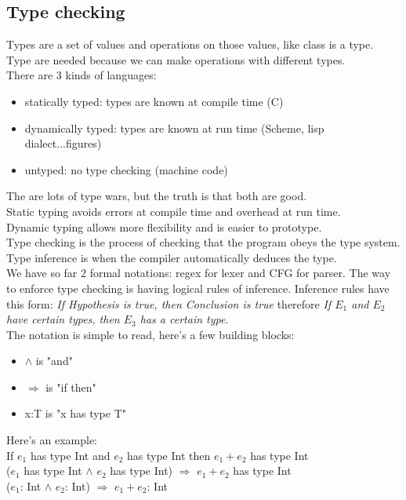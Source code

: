 \documentclass[12pt]{article}
\begin{document}
\subsection{Type checking}
Types are a set of values and operations on those values, like class is a type.
Type are needed because we can make operations with different types.
\\ There are 3 kinds of languages: 
\begin{itemize}
    \item statically typed: types are known at compile time (C)
    \item dynamically typed: types are known at run time (Scheme, lisp dialect...figures)
    \item untyped: no type checking (machine code)
\end{itemize}
The are lots of type wars, but the truth is that both are good. 
\\ Static typing avoids errors at compile time and overhead at run time. 
\\ Dynamic typing allows more flexibility and is easier to prototype.
\\ Type checking is the process of checking that the program obeys the type system. Type inference is when the compiler automatically deduces the type.
\\ We have so far 2 formal notations: regex for lexer and CFG for parser. The way to enforce type checking is having logical rules of inference. Inference rules have this form: \emph{If Hypothesis is true, then Conclusion is true} therefore \emph{If $E_1$ and $E_2$ have certain types, then $E_3$ has a certain type}.
\\ The notation is simple to read, here's a few building blocks: 
\begin{itemize}
    \item $\wedge$ is "and" 
    \item $\Rightarrow$ is "if then"
    \item x:T is "x has type T"
\end{itemize}
Here's an example: 
\\ If $e_1$ has type Int and $e_2$ has type Int then $e_1 + e_2$ has type Int
\vspace{2mm} 
\\($e_1$ has type Int $\wedge$ $e_2$ has type Int) $\Rightarrow$ $e_1 + e_2$ has type Int
\vspace{2mm} 
\\($e_1$: Int $\wedge$ $e_2$: Int) $\Rightarrow$ $e_1 + e_2$: Int
\end{document}
